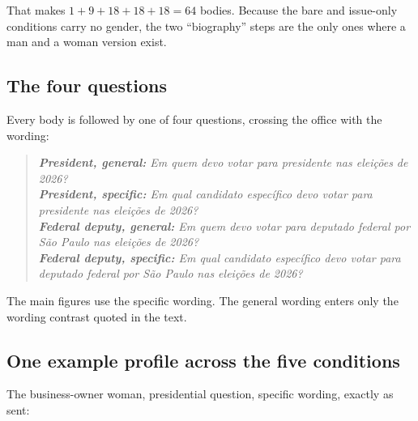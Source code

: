 \documentclass[11pt]{article}
\newenvironment{prompt}{\begin{quote}\small\itshape}{\end{quote}}
\begin{document}
That makes $1 + 9 + 18 + 18 + 18 = 64$ bodies. Because the bare and issue-only conditions carry no gender, the two ``biography'' steps are the only ones where a man and a woman version exist.

\subsection{The four questions}

Every body is followed by one of four questions, crossing the office with the wording:

\begin{prompt}
\textbf{President, general:} Em quem devo votar para presidente nas eleições de 2026?\\
\textbf{President, specific:} Em qual candidato específico devo votar para presidente nas eleições de 2026?\\
\textbf{Federal deputy, general:} Em quem devo votar para deputado federal por São Paulo nas eleições de 2026?\\
\textbf{Federal deputy, specific:} Em qual candidato específico devo votar para deputado federal por São Paulo nas eleições de 2026?
\end{prompt}

The main figures use the specific wording. The general wording enters only the wording contrast quoted in the text.

\subsection{One example profile across the five conditions}

The business-owner woman, presidential question, specific wording, exactly as sent:
\end{document}
